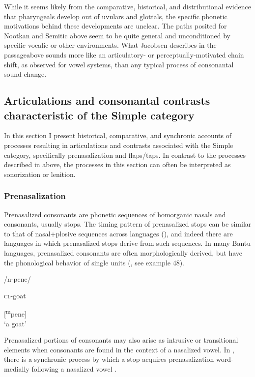   While it seems likely from the comparative, historical, and distributional evidence that pharyngeals develop out of uvulars and glottals, the specific phonetic motivations behind these developments are unclear. The paths posited for Nootkan and Semitic above seem to be quite general and unconditioned by specific vocalic or other environments. What Jacobsen describes in the passage\linebreak above sounds more like an articulatory- or perceptually-motivated chain shift, as observed for vowel systems, than any typical process of consonantal sound change.

\subsection{Articulations and consonantal contrasts characteristic of the Simple category}\label{sec:4.5.3}

  In this section I present historical, comparative, and synchronic accounts of processes resulting in articulations and contrasts associated with the Simple category, specifically prenasalization and flaps/taps. In contrast to the processes described in  above, the processes in this section can often be interpreted as sonorization or lenition.

\subsubsection{{Prenasalization} }\label{sec:4.5.3.1}

  Prenasalized consonants are phonetic sequences of homorganic nasals and consonants, usually stops. The timing pattern of prenasalized stops can be similar to that of nasal+plosive sequences across languages (\citealt{BrowmanGoldstein1986}), and indeed there are languages in which prenasalized stops derive from such sequences. In many Bantu languages, prenasalized consonants are often morphologically derived, but have the phonological behavior of single units (\citealt{Tak2011}, see example 48).

\ea\label{ex:4.48}

/n-pene/

\textsc{cl}-goat

[\textsuperscript{m}pene]\\
\glt ‘a goat’
\citep[132]{Tak2011}
\z

  Prenasalized portions of consonants may also arise as intrusive or transitional elements when consonants are found in the context of a nasalized vowel. In , there is a synchronic process by which a stop acquires prenasalization word-medially following a nasalized vowel .

